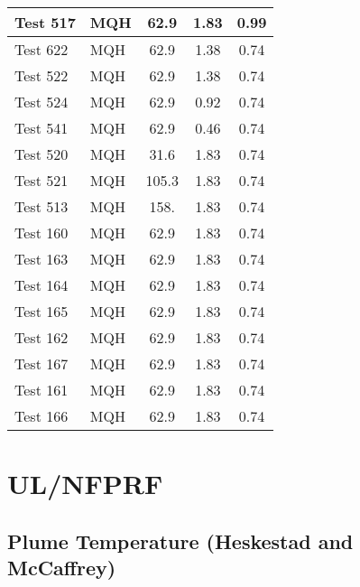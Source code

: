 \begin{table}[!ht]
\begin{center}
\begin{tabular}{|l|l|c|c|c|}
Test 517   &  MQH               &  62.9           &  1.83        &  0.99        \\ \hline
Test 622   &  MQH               &  62.9           &  1.38        &  0.74        \\ \hline
Test 522   &  MQH               &  62.9           &  1.38        &  0.74        \\ \hline
Test 524   &  MQH               &  62.9           &  0.92        &  0.74        \\ \hline
Test 541   &  MQH               &  62.9           &  0.46        &  0.74        \\ \hline
Test 520   &  MQH               &  31.6           &  1.83        &  0.74        \\ \hline
Test 521   &  MQH               &  105.3          &  1.83        &  0.74        \\ \hline
Test 513   &  MQH               &  158.           &  1.83        &  0.74        \\ \hline
Test 160   &  MQH               &  62.9           &  1.83        &  0.74        \\ \hline
Test 163   &  MQH               &  62.9           &  1.83        &  0.74        \\ \hline
Test 164   &  MQH               &  62.9           &  1.83        &  0.74        \\ \hline
Test 165   &  MQH               &  62.9           &  1.83        &  0.74        \\ \hline
Test 162   &  MQH               &  62.9           &  1.83        &  0.74        \\ \hline
Test 167   &  MQH               &  62.9           &  1.83        &  0.74        \\ \hline
Test 161   &  MQH               &  62.9           &  1.83        &  0.74        \\ \hline
Test 166   &  MQH               &  62.9           &  1.83        &  0.74        \\ \hline
\end{tabular}
\end{center}
\end{table}


\clearpage


\section{UL/NFPRF}

\subsection*{Plume Temperature (Heskestad and McCaffrey)}

